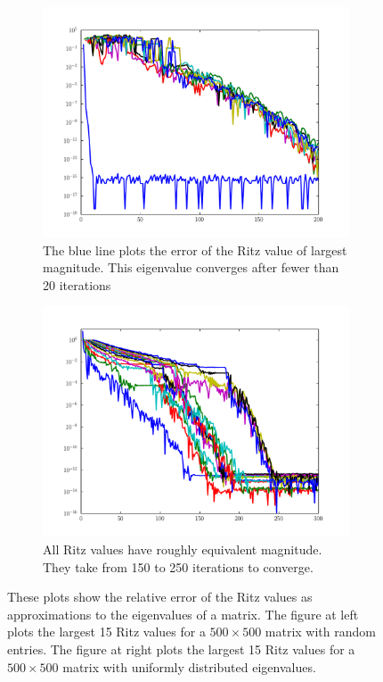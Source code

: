 \begin{figure}
\centering
\begin{subfigure}[b]{.49\textwidth}
\centering
\includegraphics[width=\textwidth]{rand_vals_conv.pdf}
\caption{The blue line plots the error of the Ritz value of largest magnitude.
This eigenvalue converges after fewer than 20 iterations}
\label{fig:arnoldi_random_val_conv}
\end{subfigure}
\begin{subfigure}[b]{.49\textwidth}
\centering
\includegraphics[width=\textwidth]{rand_eigs_conv.pdf}
\caption{All Ritz values have roughly equivalent magnitude.
They take from 150 to 250 iterations to converge. }
\label{fig:arnoldi_random_eig_conv}
\end{subfigure}
\caption{These plots show the relative error of the Ritz values as approximations to the eigenvalues of a matrix.
The figure at left plots the largest 15 Ritz values for a $500\times 500$ matrix with random entries. 
The figure at right plots the largest 15 Ritz values for a $500\times 500$ matrix with uniformly distributed eigenvalues.}
\end{figure}


